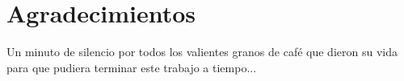 \chapter{Agradecimientos}

Un minuto de silencio por todos los valientes granos de café que dieron su vida para que pudiera terminar este trabajo a tiempo...
